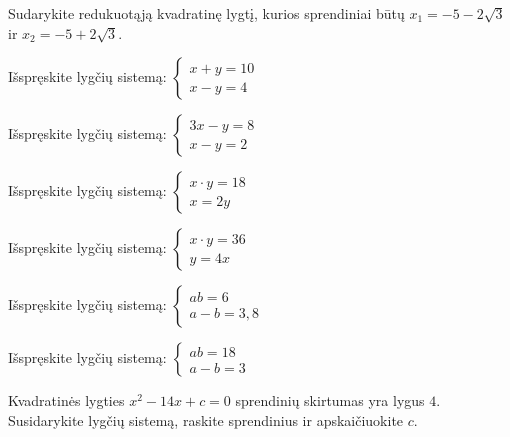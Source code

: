 \documentclass[11pt,a4paper]{scrartcl}
\begin{document}
\begin{problem}
Sudarykite redukuotąją kvadratinę lygtį, kurios sprendiniai būtų $x_1 = -5-2 \sqrt{3} $ ir $x_2 = -5+2 \sqrt{3} $.
\end{problem}

\begin{problem}
Išspręskite lygčių sistemą: $\begin{cases} x + y = 10 \\ x - y = 4 \end{cases}$
\end{problem}

\begin{problem}
Išspręskite lygčių sistemą: $\begin{cases} 3x - y = 8 \\ x - y =  2 \end{cases}$
\end{problem}

\begin{problem}
Išspręskite lygčių sistemą: $\begin{cases} x \cdot y = 18 \\ x = 2y \end{cases}$
\end{problem}

\begin{problem}
Išspręskite lygčių sistemą: $\begin{cases} x \cdot y = 36 \\ y = 4x \end{cases}$
\end{problem}

\begin{problem}
Išspręskite lygčių sistemą: $\begin{cases} ab = 6 \\ a-b = 3{,}8 \end{cases}$
\end{problem}

\begin{problem}
Išspręskite lygčių sistemą: $\begin{cases} ab = 18 \\ a-b = 3 \end{cases}$
\end{problem}

\begin{problem}
Kvadratinės lygties $x^2 - 14x + c = 0$ sprendinių skirtumas yra lygus $4$. Susidarykite lygčių sistemą, raskite sprendinius ir apskaičiuokite $c$.
\end{problem}
\end{document}
